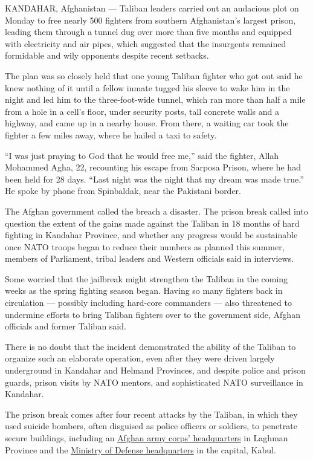 KANDAHAR, Afghanistan --- Taliban leaders carried out an audacious plot
on Monday to free nearly 500 fighters from southern Afghanistan's
largest prison, leading them through a tunnel dug over more than five
months and equipped with electricity and air pipes, which suggested that
the insurgents remained formidable and wily opponents despite recent
setbacks.

The plan was so closely held that one young Taliban fighter who got out
said he knew nothing of it until a fellow inmate tugged his sleeve to
wake him in the night and led him to the three-foot-wide tunnel, which
ran more than half a mile from a hole in a cell's floor, under security
posts, tall concrete walls and a highway, and came up in a nearby house.
From there, a waiting car took the fighter a few miles away, where he
hailed a taxi to safety.

``I was just praying to God that he would free me,'' said the fighter,
Allah Mohammed Agha, 22, recounting his escape from Sarposa Prison,
where he had been held for 28 days. ``Last night was the night that my
dream was made true.'' He spoke by phone from Spinbaldak, near the
Pakistani border.

The Afghan government called the breach a disaster. The prison break
called into question the extent of the gains made against the Taliban in
18 months of hard fighting in Kandahar Province, and whether any
progress would be sustainable once NATO troops began to reduce their
numbers as planned this summer, members of Parliament, tribal leaders
and Western officials said in interviews.

Some worried that the jailbreak might strengthen the Taliban in the
coming weeks as the spring fighting season began. Having so many
fighters back in circulation --- possibly including hard-core commanders
--- also threatened to undermine efforts to bring Taliban fighters over
to the government side, Afghan officials and former Taliban said.

There is no doubt that the incident demonstrated the ability of the
Taliban to organize such an elaborate operation, even after they were
driven largely underground in Kandahar and Helmand Provinces, and
despite police and prison guards, prison visits by NATO mentors, and
sophisticated NATO surveillance in Kandahar.

The prison break comes after four recent attacks by the Taliban, in
which they used suicide bombers, often disguised as police officers or
soldiers, to penetrate secure buildings, including an
\href{http://www.nytimes.com/2011/04/17/world/asia/17afghanistan.html}{Afghan
army corps' headquarters} in Laghman Province and the
\href{http://www.nytimes.com/2011/04/19/world/asia/19afghanistan.html}{Ministry
of Defense headquarters} in the capital, Kabul.

